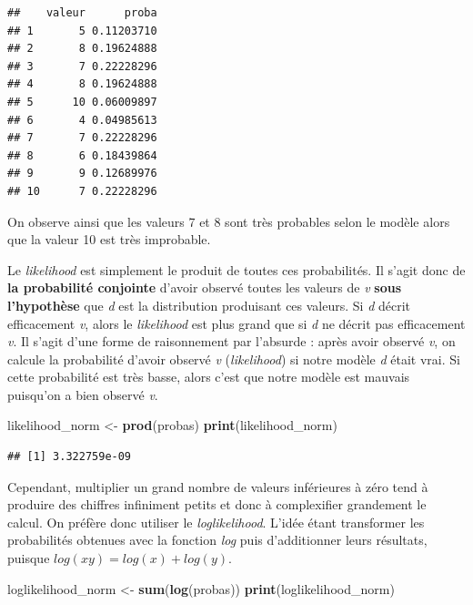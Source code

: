 \documentclass[
  11pt,
  french,
]{book}
\makeatletter
\newenvironment{Shaded}{\begin{snugshade}}{\end{snugshade}}
\newcommand{\KeywordTok}[1]{\textcolor[rgb]{0.13,0.29,0.53}{\textbf{#1}}}
\newcommand{\NormalTok}[1]{#1}
\newcommand{\StringTok}[1]{\textcolor[rgb]{0.31,0.60,0.02}{#1}}
\newenvironment{kframe}{%
\medskip{}
\setlength{\fboxsep}{.8em}
 \def\at@end@of@kframe{}%
 \ifinner\ifhmode%
  \def\at@end@of@kframe{\end{minipage}}%
  \begin{minipage}{\columnwidth}%
 \fi\fi%
 \def\FrameCommand##1{\hskip\@totalleftmargin \hskip-\fboxsep
 \colorbox{shadecolor}{##1}\hskip-\fboxsep
     \hskip-\linewidth \hskip-\@totalleftmargin \hskip\columnwidth}%
 \MakeFramed {\advance\hsize-\width
   \@totalleftmargin\z@ \linewidth\hsize
   \@setminipage}}%
 {\par\unskip\endMakeFramed%
 \at@end@of@kframe}
\newenvironment{kframev}{%
\medskip{}
\setlength{\fboxsep}{.8em}
 \def\at@end@of@kframev{}%
 \ifinner\ifhmode%
  \def\at@end@of@kframev{\end{minipage}}%
  \begin{minipage}{\columnwidth}%
 \fi\fi%
 \def\FrameCommand##1{\hskip\@totalleftmargin \hskip-\fboxsep
 \colorbox{shadebluecolor}{##1}\hskip-\fboxsep
     \hskip-\linewidth \hskip-\@totalleftmargin \hskip\columnwidth}%
 \MakeFramed {\advance\hsize-\width
   \@totalleftmargin\z@ \linewidth\hsize
   \@setminipage}}%
 {\par\unskip\endMakeFramed%
 \at@end@of@kframev}
\renewenvironment{Shaded}{\begin{kframe}}{\end{kframe}}
\newenvironment{rmdblock}[1]
  {
  \begin{itemize}
  \renewcommand{\labelitemi}{
    \raisebox{-.7\height}[0pt][0pt]{
      {\setkeys{Gin}{width=3em,keepaspectratio}\texttt{[image: images/\#1]}}
    }
  }
  \setlength{\fboxsep}{1em}
  \begin{kframev}
  \small
  \item
  }
  {
  \end{kframev}
  \end{itemize}
  }
\newenvironment{bloc_aller_loin}
  {\begin{rmdblock}{aller_loin}}
  {\end{rmdblock}}
\makeatother
\begin{document}
\begin{bloc_aller_loin}
\begin{verbatim}
##    valeur      proba
## 1       5 0.11203710
## 2       8 0.19624888
## 3       7 0.22228296
## 4       8 0.19624888
## 5      10 0.06009897
## 6       4 0.04985613
## 7       7 0.22228296
## 8       6 0.18439864
## 9       9 0.12689976
## 10      7 0.22228296
\end{verbatim}

On observe ainsi que les valeurs 7 et 8 sont très probables selon le modèle alors que la valeur 10 est très improbable.

Le \emph{likelihood} est simplement le produit de toutes ces probabilités. Il s'agit donc de \textbf{la probabilité conjointe} d'avoir observé toutes les valeurs de \emph{v} \textbf{sous l'hypothèse} que \emph{d} est la distribution produisant ces valeurs. Si \emph{d} décrit efficacement \emph{v}, alors le \emph{likelihood} est plus grand que si \emph{d} ne décrit pas efficacement \emph{v}. Il s'agit d'une forme de raisonnement par l'absurde : après avoir observé \emph{v}, on calcule la probabilité d'avoir observé \emph{v} (\emph{likelihood}) si notre modèle \emph{d} était vrai. Si cette probabilité est très basse, alors c'est que notre modèle est mauvais puisqu'on a bien observé \emph{v}.

\begin{Shaded}
\begin{Highlighting}[]
\NormalTok{likelihood_norm <-}\StringTok{ }\KeywordTok{prod}\NormalTok{(probas)}
\KeywordTok{print}\NormalTok{(likelihood_norm)}
\end{Highlighting}
\end{Shaded}

\begin{verbatim}
## [1] 3.322759e-09
\end{verbatim}

Cependant, multiplier un grand nombre de valeurs inférieures à zéro tend à produire des chiffres infiniment petits et donc à complexifier grandement le calcul. On préfère donc utiliser le \emph{loglikelihood}. L'idée étant transformer les probabilités obtenues avec la fonction \emph{log} puis d'additionner leurs résultats, puisque \(log(xy) = log(x)+log(y)\).

\begin{Shaded}
\begin{Highlighting}[]
\NormalTok{loglikelihood_norm <-}\StringTok{ }\KeywordTok{sum}\NormalTok{(}\KeywordTok{log}\NormalTok{(probas))}
\KeywordTok{print}\NormalTok{(loglikelihood_norm)}
\end{Highlighting}
\end{Shaded}


\end{bloc_aller_loin}
\end{document}
